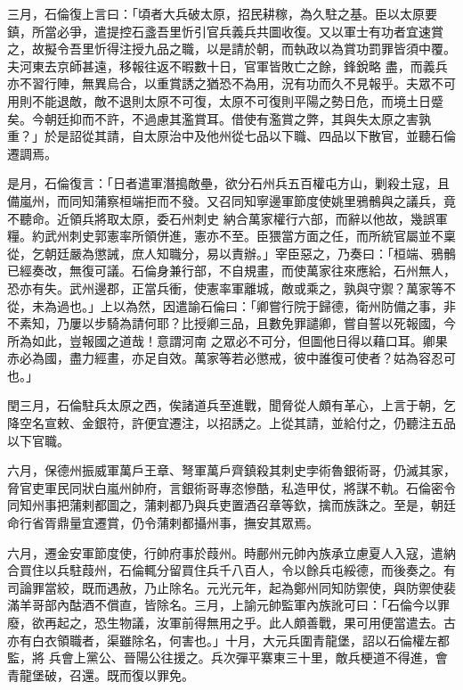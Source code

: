 \begin{pinyinscope}
 三月，石倫復上言曰：「頃者大兵破太原，招民耕稼，為久駐之基。臣以太原要鎮，所當必爭，遣提控石盞吾里忻引官兵義兵共圖收復。又以軍士有功者宜速賞之，故擬令吾里忻得注授九品之職，以是請於朝，而執政以為賞功罰罪皆須中覆。夫河東去京師甚遠，移報往返不暇數十日，官軍皆敗亡之餘，鋒銳略
 盡，而義兵亦不習行陣，無異烏合，以重賞誘之猶恐不為用，況有功而久不見報乎。夫眾不可用則不能退敵，敵不退則太原不可復，太原不可復則平陽之勢日危，而境土日蹙矣。今朝廷抑而不許，不過慮其濫賞耳。借使有濫賞之弊，其與失太原之害孰重？」於是詔從其請，自太原治中及他州從七品以下職、四品以下散官，並聽石倫遷調焉。



 是月，石倫復言：「日者遣軍潛搗敵壘，欲分石州兵五百權屯方山，剿殺土寇，且備嵐州，而同知蒲察桓端拒而不發。又召同知寧邊軍節度使姚里鴉鶻與之議兵，竟不聽命。近領兵將取太原，委石州刺史
 納合萬家權行六部，而辭以他故，幾誤軍糧。約武州刺史郭憲率所領併進，憲亦不至。臣猥當方面之任，而所統官屬並不稟從，乞朝廷嚴為懲誡，庶人知職分，易以責辦。」宰臣惡之，乃奏曰：「桓端、鴉鶻已經奏改，無復可議。石倫身兼行部，不自規畫，而使萬家往來應給，石州無人，恐亦有失。武州邊郡，正當兵衝，使憲率軍離城，敵或乘之，孰與守禦？萬家等不從，未為過也。」上以為然，因遣諭石倫曰：「卿嘗行院于歸德，衛州防備之事，非不素知，乃屢以步騎為請何耶？比授卿三品，且數免罪譴卿，嘗自誓以死報國，今所為如此，豈報國之道哉！意謂河南
 之眾必不可分，但圖他日得以藉口耳。卿果赤必為國，盡力經畫，亦足自效。萬家等若必懲戒，彼中誰復可使者？姑為容忍可也。」



 閏三月，石倫駐兵太原之西，俟諸道兵至進戰，聞脅從人頗有革心，上言于朝，乞降空名宣敕、金銀符，許便宜遷注，以招誘之。上從其請，並給付之，仍聽注五品以下官職。



 六月，保德州振威軍萬戶王章、弩軍萬戶齊鎮殺其刺史孛術魯銀術哥，仍滅其家，脅官吏軍民同狀白嵐州帥府，言銀術哥專恣慘酷，私造甲仗，將謀不軌。石倫密令同知州事把蒲剌都圖之，蒲剌都乃與兵吏置酒召章等欽，擒而族誅之。至是，朝廷
 命行省胥鼎量宜遷賞，仍令蒲剌都攝州事，撫安其眾焉。



 六月，遷金安軍節度使，行帥府事於葭州。時鄜州元帥內族承立慮夏人入寇，遣納合買住以兵駐葭州，石倫輒分留買住兵千八百人，令以餘兵屯綏德，而後奏之。有司論罪當絞，既而遇赦，乃止除名。元光元年，起為鄭州同知防禦使，與防禦使裴滿羊哥部內酤酒不償直，皆除名。三月，上諭元帥監軍內族訛可曰：「石倫今以罪廢，欲再起之，恐生物議，汝軍前得無用之乎。此人頗善戰，果可用便當遣去。古亦有白衣領職者，渠雖除名，何害也。」十月，大元兵圍青龍堡，詔以石倫權左都監，將
 兵會上黨公、晉陽公往援之。兵次彈平寨東三十里，敵兵梗道不得進，會青龍堡破，召還。既而復以罪免。




\end{pinyinscope}
